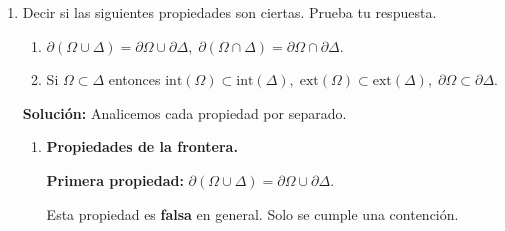 \documentclass[12pt]{article}
\newcommand{\Ext}{\mathrm{ext}}
\newcommand{\Int}{\mathrm{int}}
\newcommand{\R}{\mathbb R}
\begin{document}
\begin{enumerate}
\begin{enumerate}[(1)]
\textbf{Segunda propiedad:} $\Ext(\Omega\cap \Delta) = \Ext(\Omega)\cap \Ext(\Delta)$.

Esta propiedad es \textbf{falsa} en general.

\textit{Contraejemplo:} Tomemos $\Omega = (-\infty, 1)$ y $\Delta = (0, \infty)$ en $\R$. Entonces $\Omega \cap \Delta = (0, 1)$. Calculamos los exteriores:
\[
\Ext(\Omega \cap \Delta) = \Ext((0,1)) = \Int(\R \setminus (0,1)) = \Int((-\infty, 0] \cup [1, \infty)) = (-\infty, 0) \cup (1, \infty).
\]
Por otro lado,
\[
\Ext(\Omega) = \Ext((-\infty, 1)) = \Int([1, \infty)) = (1, \infty),
\]
\[
\Ext(\Delta) = \Ext((0, \infty)) = \Int((-\infty, 0]) = (-\infty, 0).
\]
Entonces,
\[
\Ext(\Omega) \cap \Ext(\Delta) = (1, \infty) \cap (-\infty, 0) = \emptyset.
\]
Claramente, $\Ext(\Omega \cap \Delta) = (-\infty, 0) \cup (1, \infty) \neq \emptyset = \Ext(\Omega) \cap \Ext(\Delta)$. Por lo tanto, la igualdad es falsa.

\textbf{Observación:} Usando las leyes de De Morgan, se puede demostrar que las propiedades correctas para el exterior son:
\[
\Ext(\Omega \cup \Delta) = \Ext(\Omega) \cap \Ext(\Delta),
\]
\[
\Ext(\Omega \cap \Delta) = \Ext(\Omega) \cup \Ext(\Delta).
\]
Es decir, el exterior intercambia uniones por intersecciones y viceversa, de manera análoga al complemento.
\end{enumerate}

\item Decir si las siguientes propiedades son ciertas. Prueba tu respuesta.
\begin{enumerate}[(1)]
\item $\partial(\Omega\cup \Delta) = \partial \Omega\cup \partial \Delta,\; 
\partial(\Omega\cap \Delta) = \partial \Omega\cap \partial \Delta$.
\item Si $\Omega\subset \Delta$ entonces $\Int(\Omega)\subset \Int(\Delta),\; \Ext(\Omega)\subset \Ext(\Delta),\; \partial \Omega\subset \partial \Delta$.
\end{enumerate}

\textbf{Solución: } Analicemos cada propiedad por separado.

\begin{enumerate}[(1)]
\item \textbf{Propiedades de la frontera.}

\textbf{Primera propiedad:} $\partial(\Omega\cup \Delta) = \partial \Omega\cup \partial \Delta$.

Esta propiedad es \textbf{falsa} en general. Solo se cumple una contención.


\end{enumerate}
\end{enumerate}
\end{document}
